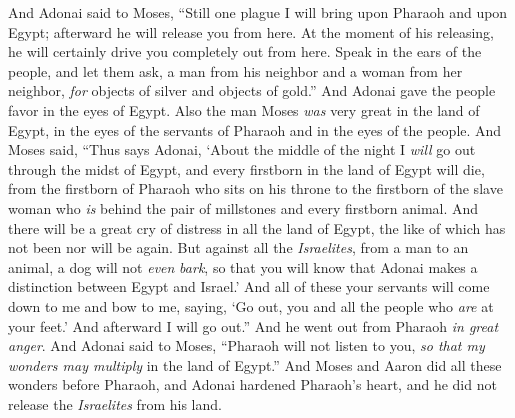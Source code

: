 \begin{biblechapter} %
 And Adonai said to Moses, “Still one plague I will bring upon Pharaoh and upon Egypt; afterward he will release you from here. At the moment of his releasing, he will certainly drive you completely out from here.
\verse Speak in the ears of the people, and let them ask, a man from his neighbor and a woman from her neighbor, \textit{for} objects of silver and objects of gold.”
\verse And Adonai gave the people favor in the eyes of Egypt. Also the man Moses \textit{was} very great in the land of Egypt, in the eyes of the servants of Pharaoh and in the eyes of the people.
\verse And Moses said, “Thus says Adonai, ‘About the middle of the night I \textit{will} go out through the midst of Egypt,
\verse and every firstborn in the land of Egypt will die, from the firstborn of Pharaoh who sits on his throne to the firstborn of the slave woman who \textit{is} behind the pair of millstones and every firstborn animal.
\verse And there will be a great cry of distress in all the land of Egypt, the like of which has not been nor will be again.
\verse But against all the \textit{Israelites}, from a man to an animal, a dog will not \textit{even} \textit{bark}, so that you will know that Adonai makes a distinction between Egypt and Israel.’
\verse And all of these your servants will come down to me and bow to me, saying, ‘Go out, you and all the people who \textit{are} at your feet.’ And afterward I will go out.” And he went out from Pharaoh \textit{in great anger}.
\verse And Adonai said to Moses, “Pharaoh will not listen to you, \textit{so that my wonders may multiply} in the land of Egypt.”
\verse And Moses and Aaron did all these wonders before Pharaoh, and Adonai hardened Pharaoh’s heart, and he did not release the \textit{Israelites} from his land.
\end{biblechapter}

